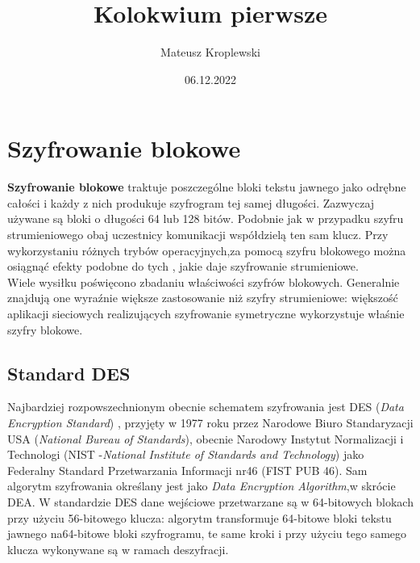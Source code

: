 \documentclass[12pt, letterpaper, titlepage]{article}
\title{Kolokwium pierwsze}
\author{Mateusz Kroplewski}
\date{06.12.2022}
\begin{document}
\maketitle
\section{Szyfrowanie blokowe}
\textbf{Szyfrowanie blokowe} \cite{blokowe} traktuje poszczególne bloki tekstu jawnego jako odrębne całości i każdy z nich produkuje szyfrogram tej samej długości. Zazwyczaj używane są bloki o długości 64 lub 128 bitów. Podobnie jak w przypadku szyfru strumieniowego obaj uczestnicy komunikacji  współdzielą ten sam klucz. Przy wykorzystaniu różnych trybów operacyjnych,za pomocą szyfru blokowego można osiągnąć efekty podobne do tych , jakie daje szyfrowanie strumieniowe. \\ Wiele wysiłku poświęcono zbadaniu właściwości szyfrów blokowych. Generalnie znajdują one wyraźnie większe zastosowanie niż szyfry strumieniowe: większość aplikacji sieciowych realizujących szyfrowanie symetryczne wykorzystuje właśnie szyfry blokowe.
\subsection{Standard DES}
Najbardziej rozpowszechnionym obecnie schematem szyfrowania jest DES (\textit{Data Encryption Standard}) \cite{des}, przyjęty w 1977 roku przez Narodowe Biuro Standaryzacji USA (\textit{National Bureau of Standards}), obecnie Narodowy Instytut Normalizacji i Technologi (NIST -\textit{National Institute of Standards and Technology}) jako Federalny Standard Przetwarzania Informacji nr46 (FIST PUB 46). Sam algorytm szyfrowania określany jest jako \textit{Data Encryption Algorithm},w skrócie DEA. W standardzie DES dane wejściowe przetwarzane są w 64-bitowych blokach przy użyciu 56-bitowego klucza: algorytm transformuje 64-bitowe bloki tekstu jawnego na64-bitowe bloki szyfrogramu, te same kroki i przy użyciu tego samego klucza wykonywane są w ramach deszyfracji.
\end{document}
